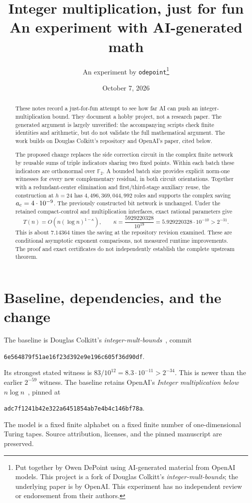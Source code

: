 \documentclass[11pt]{article}
\title{Integer multiplication, just for fun\newline
\large An experiment with AI-generated math}
\author{An experiment by \texttt{odepoint}\thanks{Put together by Owen DePoint
using AI-generated material from OpenAI models. This project is a fork of
Douglas Colkitt's \emph{integer-mult-bounds}; the underlying paper is by OpenAI. This experiment has no
independent review or endorsement from their authors.}}
\date{October 7, 2026}
\newcommand{\ac}{a_{\rm c}}
\begin{document}
\maketitle
\begin{abstract}
These notes record a just-for-fun attempt to see how far AI can push an
integer-multiplication bound. They document a hobby project, not a research
paper. The generated argument is largely unverified: the accompanying scripts
check finite identities and arithmetic, but do not validate the full mathematical
argument. The work builds on Douglas Colkitt's repository and OpenAI's paper,
cited below.

The proposed change replaces the side correction circuit in the complex finite network by
reusable sums of triple indicators sharing two fixed points.  Within each
batch these indicators are orthonormal over $\mathbb F_2$.  A bounded batch
size provides explicit norm-one witnesses for every new complementary
residual, in both circuit orientations.  Together with a redundant-center
elimination and first/third-stage auxiliary reuse, the construction at
$h=24$ has $4{,}496{,}369{,}044{,}992$ roles and supports the complex
saving $\ac=4\cdot10^{-9}$.  The previously constructed bit network is
unchanged.  Under the retained compact-control and multiplication
interfaces, exact rational parameters give
\[
 T(n)=O\!\left(n(\log n)^{1-\kappa}\right),\qquad
 \kappa=\frac{5929220328}{10^{19}}
       =5.929220328\cdot10^{-10}>2^{-31}.
\]
This is about $7.14364$ times the saving at the repository revision
examined.  These are conditional asymptotic exponent comparisons,
not measured runtime improvements.  The proof and exact certificates do
not independently establish the complete upstream theorem.
\end{abstract}

\section{Baseline, dependencies, and the change}
The baseline is Douglas Colkitt's \emph{integer-mult-bounds}~\cite{baseline}, commit
\begin{center}\texttt{6e564879f51ae16f23d392e9e196c605f36d90df}.\end{center}
Its strongest stated witness is $83/10^{12}=8.3\cdot10^{-11}>2^{-34}$.
This is newer than the earlier $2^{-59}$ witness.  The baseline retains
OpenAI's \emph{Integer multiplication below $n\log n$}~\cite{upstream}, pinned at
\begin{center}\texttt{adc7f1241b42e322a6451854ab7e4b4c146bf78a}.\end{center}
The model is a fixed finite alphabet on a fixed finite number of
one-dimensional Turing tapes.  Source attribution, licenses, and the
pinned manuscript are preserved.
\end{document}
